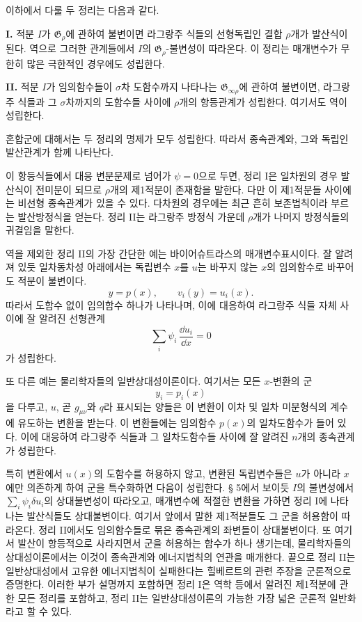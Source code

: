 이하에서 다룰 두 정리는 다음과 같다.

\textbf{I.} 적분 \(I\)가 \(\mathfrak G_\rho\)에 관하여 불변이면 라그랑주 식들의 선형독립인 결합 \(\rho\)개가 발산식이 된다. 역으로 그러한 관계들에서 \(I\)의 \(\mathfrak G_\rho\)-불변성이 따라온다. 이 정리는 매개변수가 무한히 많은 극한적인 경우에도 성립한다.

\textbf{II.} 적분 \(I\)가 임의함수들이 \(\sigma\)차 도함수까지 나타나는 \(\mathfrak G_{\infty\rho}\)에 관하여 불변이면, 라그랑주 식들과 그 \(\sigma\)차까지의 도함수들 사이에 \(\rho\)개의 항등관계가 성립한다. 여기서도 역이 성립한다.

혼합군에 대해서는 두 정리의 명제가 모두 성립한다. 따라서 종속관계와, 그와 독립인 발산관계가 함께 나타난다.

이 항등식들에서 대응 변분문제로 넘어가 \(\psi=0\)으로 두면, 정리 I은 일차원의 경우 발산식이 전미분이 되므로 \(\rho\)개의 제1적분이 존재함을 말한다. 다만 이 제1적분들 사이에는 비선형 종속관계가 있을 수 있다. 다차원의 경우에는 최근 흔히 \glqq{}보존법칙\grqq{}이라 부르는 발산방정식을 얻는다. 정리 II는 라그랑주 방정식 가운데 \(\rho\)개가 나머지 방정식들의 귀결임을 말한다.

역을 제외한 정리 II의 가장 간단한 예는 바이어슈트라스의 매개변수표시이다. 잘 알려져 있듯 일차동차성 아래에서는 독립변수 \(x\)를 \(u\)는 바꾸지 않는 \(x\)의 임의함수로 바꾸어도 적분이 불변이다.
\[
y=p(x),\qquad v_i(y)=u_i(x).
\]
따라서 도함수 없이 임의함수 하나가 나타나며, 이에 대응하여 라그랑주 식들 자체 사이에 잘 알려진 선형관계
\[
\sum_i\psi_i\,\frac{\dd u_i}{\dd x}=0
\]
가 성립한다.

또 다른 예는 물리학자들의 \glqq{}일반상대성이론\grqq{}이다. 여기서는 모든 \(x\)-변환의 군
\[
y_i=p_i(x)
\]
을 다루고, \(u\), 곧 \(g_{\mu\nu}\)와 \(q\)라 표시되는 양들은 이 변환이 이차 및 일차 미분형식의 계수에 유도하는 변환을 받는다. 이 변환들에는 임의함수 \(p(x)\)의 일차도함수가 들어 있다. 이에 대응하여 라그랑주 식들과 그 일차도함수들 사이에 잘 알려진 \(n\)개의 종속관계가 성립한다.

특히 변환에서 \(u(x)\)의 도함수를 허용하지 않고, 변환된 독립변수들은 \(u\)가 아니라 \(x\)에만 의존하게 하여 군을 특수화하면 다음이 성립한다. § 5에서 보이듯 \(I\)의 불변성에서 \(\sum_i\psi_i\delta u_i\)의 상대불변성이 따라오고, 매개변수에 적절한 변환을 가하면 정리 I에 나타나는 발산식들도 상대불변이다. 여기서 앞에서 말한 제1적분들도 그 군을 허용함이 따라온다. 정리 II에서도 임의함수들로 묶은 종속관계의 좌변들이 상대불변이다. 또 여기서 발산이 항등적으로 사라지면서 군을 허용하는 함수가 하나 생기는데, 물리학자들의 상대성이론에서는 이것이 종속관계와 에너지법칙의 연관을 매개한다. 끝으로 정리 II는 \glqq{}일반상대성\grqq{}에서 고유한 에너지법칙이 실패한다는 힐베르트의 관련 주장을 군론적으로 증명한다. 이러한 부가 설명까지 포함하면 정리 I은 역학 등에서 알려진 제1적분에 관한 모든 정리를 포함하고, 정리 II는 \glqq{}일반상대성이론\grqq{}의 가능한 가장 넓은 군론적 일반화라고 할 수 있다.

